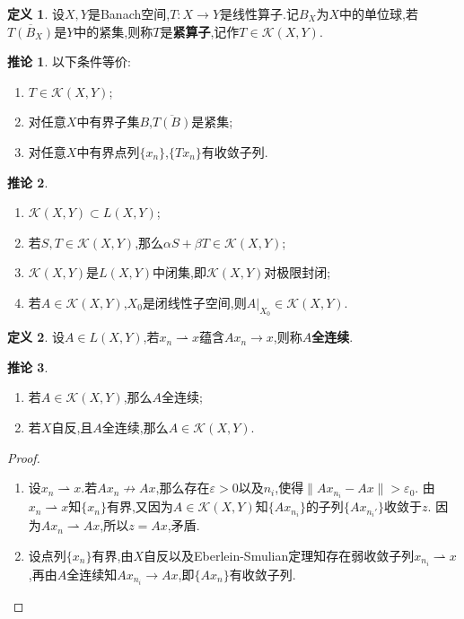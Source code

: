 \documentclass{ctexart}
\theoremstyle{definition}
\newtheorem{definition}{定义}
\newtheorem{corollary}{推论}
\theoremstyle{remark}
\begin{document}
	\begin{definition}
		设$X,Y$是Banach空间,$T:X\to Y$是线性算子.记$B_X$为$X$中的单位球,若$\overline{T(B_X)}$是$Y$中的紧集,则称$T$是\textbf{紧算子},记作$T\in\mathcal{K}(X,Y)$.
	\end{definition}
	\begin{corollary}
		以下条件等价:
		\begin{enumerate}
			\item $T\in\mathcal{K}(X,Y)$;
			\item 对任意$X$中有界子集$B$,$\overline{T(B)}$是紧集;
			\item 对任意$X$中有界点列$\{x_n\}$,$\{Tx_n\}$有收敛子列.
		\end{enumerate}
	\end{corollary}
	\begin{corollary}
		\begin{enumerate}
			\item $\mathcal{K}(X,Y)\subset L(X,Y)$;
			\item 若$S,T\in\mathcal{K}(X,Y)$,那么$\alpha S+\beta T\in\mathcal{K}(X,Y)$;
			\item $\mathcal{K}(X,Y)$是$L(X,Y)$中闭集,即$\mathcal{K}(X,Y)$对极限封闭;
			\item 若$A\in\mathcal{K}(X,Y)$,$X_0$是闭线性子空间,则$A|_{X_0}\in\mathcal{K}(X,Y)$.
		\end{enumerate}
	\end{corollary}
	
	\begin{definition}
		设$A\in L(X,Y)$,若$x_n\rightharpoonup x$蕴含$Ax_n\to x$,则称$A$\textbf{全连续}.
	\end{definition}
	\begin{corollary}
		\begin{enumerate}
			\item 若$A\in\mathcal{K}(X,Y)$,那么$A$全连续;
			\item 若$X$自反,且$A$全连续,那么$A\in\mathcal{K}(X,Y)$.
		\end{enumerate}
	\end{corollary}
	\begin{proof}
		\begin{enumerate}
			\item 设$x_n\rightharpoonup x$.若$Ax_n\not\to Ax$,那么存在$\varepsilon>0$以及$n_i$,使得$\|Ax_{n_i}-Ax\|>\varepsilon_0$.
			由$x_n\rightharpoonup x$知$\{x_n\}$有界,又因为$A\in\mathcal{K}(X,Y)$知$\{Ax_{n_i}\}$的子列$\{Ax_{n_i'}\}$收敛于$z$.
			因为$Ax_n\rightharpoonup Ax$,所以$z=Ax$,矛盾.
			
			\item 设点列$\{x_n\}$有界,由$X$自反以及Eberlein-Smulian定理知存在弱收敛子列$x_{n_i}\rightharpoonup x$,再由$A$全连续知$Ax_{n_i}\to Ax$,即$\{Ax_n\}$有收敛子列.
		\end{enumerate}
	\end{proof}
	
\end{document}
